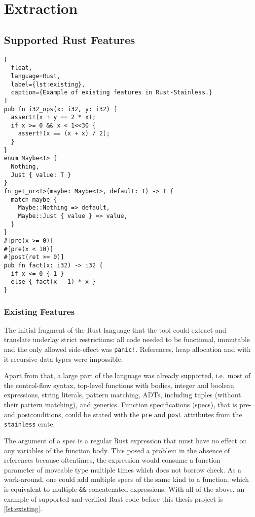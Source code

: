 \section{Extraction}

\subsection{Supported Rust Features}
\label{sec:supported-features}

\begin{lstlisting}[
  float,
  language=Rust,
  label={lst:existing},
  caption={Example of existing features in Rust-Stainless.}
]
pub fn i32_ops(x: i32, y: i32) {
  assert!(x + y == 2 * x);
  if x >= 0 && x < 1<<30 {
    assert!(x == (x + x) / 2);
  }
}
enum Maybe<T> {
  Nothing,
  Just { value: T }
}
fn get_or<T>(maybe: Maybe<T>, default: T) -> T {
  match maybe {
    Maybe::Nothing => default,
    Maybe::Just { value } => value,
  }
}
#[pre(x >= 0)]
#[pre(x < 10)]
#[post(ret >= 0)]
pub fn fact(x: i32) -> i32 {
  if x <= 0 { 1 }
  else { fact(x - 1) * x }
}
\end{lstlisting}

\subsubsection{Existing Features}

The initial fragment of the Rust language that the tool could extract and
translate underlay strict restrictions: all code needed to be functional,
immutable and the only allowed side-effect was \lstinline"panic!". References,
heap allocation and with it recursive data types were impossible.

Apart from that, a large part of the language was already supported, i.e.~most
of the control-flow syntax, top-level functions with bodies, integer and boolean
expressions, string literals, pattern matching, ADTs, including tuples (without
their pattern matching), and generics. Function specifications (specs), that is
pre- and postconditions, could be stated with the \lstinline!pre! and
\lstinline!post! attributes from the \lstinline!stainless! crate.

The argument of a spec is a regular Rust expression that must have no effect on
any variables of the function body. This posed a problem in the absence of
references because oftentimes, the expression would consume a function parameter
of moveable type multiple times which does not borrow check. As a work-around,
one could add multiple specs of the same kind to a function, which is equivalent
to multiple \lstinline!&&!-concatenated expressions. With all of the above, an
example of supported and verified Rust code before this thesis project is
\autoref{lst:existing}.

